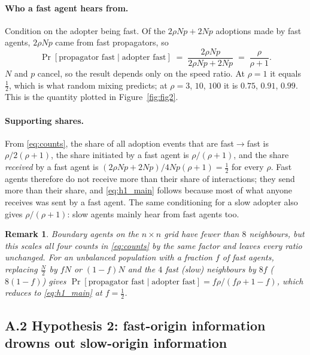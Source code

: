 \documentclass{article}
\newtheorem{remark}{Remark}
\begin{document}
\paragraph{Who a fast agent hears from.} Condition on the adopter being fast. Of the $2\rho Np + 2Np$ adoptions made by fast agents, $2\rho Np$ came from fast propagators, so
\begin{equation}
\Pr[\text{propagator fast} \mid \text{adopter fast}] \;=\; \frac{2\rho N p}{2\rho N p + 2 N p} \;=\; \frac{\rho}{\rho+1}.
\label{eq:h1_main}
\end{equation}
$N$ and $p$ cancel, so the result depends only on the speed ratio. At $\rho = 1$ it equals $\tfrac12$, which is what random mixing predicts; at $\rho = 3$, $10$, $100$ it is $0.75$, $0.91$, $0.99$. This is the quantity plotted in Figure~\ref{fig:fig2}.

\paragraph{Supporting shares.} From \eqref{eq:counts}, the share of all adoption events that are fast$\to$fast is $\rho/2(\rho+1)$, the share initiated by a fast agent is $\rho/(\rho+1)$, and the share \emph{received} by a fast agent is $(2\rho Np + 2Np)/4Np(\rho+1) = \tfrac12$ for every $\rho$. Fast agents therefore do not receive more than their share of interactions; they send more than their share, and \eqref{eq:h1_main} follows because most of what anyone receives was sent by a fast agent. The same conditioning for a slow adopter also gives $\rho/(\rho+1)$: slow agents mainly hear from fast agents too.

\begin{remark}
Boundary agents on the $n \times n$ grid have fewer than $8$ neighbours, but this scales all four counts in \eqref{eq:counts} by the same factor and leaves every ratio unchanged. For an unbalanced population with a fraction $f$ of fast agents, replacing $\tfrac{N}{2}$ by $fN$ or $(1-f)N$ and the $4$ fast (slow) neighbours by $8f$ ($8(1-f)$) gives $\Pr[\text{propagator fast} \mid \text{adopter fast}] = f\rho/(f\rho + 1 - f)$, which reduces to \eqref{eq:h1_main} at $f = \tfrac12$.
\end{remark}

\subsection*{A.2 \quad Hypothesis 2: fast-origin information drowns out slow-origin information}
\end{document}

